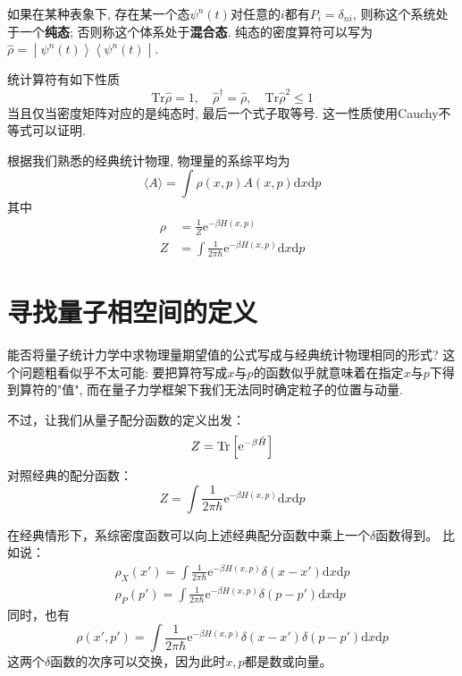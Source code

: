         如果在某种表象下, 存在某一个态$\psi^{n}(t)$对任意的$i$都有$P_i = \delta_{ni}$, 则称这个系统处于一个\textbf{纯态}; 否则称这个体系处于\textbf{混合态}.
        纯态的密度算符可以写为$\hat{\rho} = \left. \middle| {\psi^{n}(t)} \right\rangle \left\langle {\psi^{n}(t)} \middle| \right.$. 

        统计算符有如下性质
        \begin{equation}
            \mathrm{Tr}\hat\rho = 1, \quad
            \hat\rho^{\dagger} = \hat\rho, \quad
            \mathrm{Tr}\hat\rho^{2} \leq 1
        \end{equation}
        当且仅当密度矩阵对应的是纯态时, 最后一个式子取等号. 这一性质使用Cauchy不等式可以证明. 

        \splitline

        根据我们熟悉的经典统计物理, 物理量的系综平均为
        \begin{equation}
            \langle A \rangle = \int \rho(x,p) A(x,p) \mathrm{d}x\mathrm{d}p
        \end{equation}
        其中
        \begin{equation}\begin{aligned}
            \rho &= \frac 1Z \mathrm{e}^{-\beta H(x,p)}\\
            Z &= \int \frac 1{2\pi \hbar} \mathrm{e}^{-\beta H(x,p)} \mathrm{d}x \mathrm{d}p
        \end{aligned}\end{equation}

    \section{寻找量子相空间的定义}

        能否将量子统计力学中求物理量期望值的公式写成与经典统计物理相同的形式? 
        这个问题粗看似乎不太可能: 要把算符写成$x$与$p$的函数似乎就意味着在指定$x$与$p$下得到算符的"值", 
        而在量子力学框架下我们无法同时确定粒子的位置与动量. 
        
        不过，让我们从量子配分函数的定义出发：
        \[
            Z = \textrm{Tr}\left[\mathrm{e}^{-\beta \hat{H}}\right]
        \]
        对照经典的配分函数：
        \[
            Z = \int \frac {1}{2\pi \hbar} \mathrm{e}^{-\beta H(x,p)} \mathrm{d}x \mathrm{d}p
        \]

        在经典情形下，系综密度函数可以向上述经典配分函数中乘上一个\(\delta\)函数得到。
        比如说：
        \[
            \begin{gathered}
                \rho_X(x') = \int \frac 1{2\pi \hbar} \mathrm{e}^{-\beta H(x,p)} \delta(x - x') \mathrm{d}x \mathrm{d}p
                \\
                \rho_P(p') = \int \frac 1{2\pi \hbar} \mathrm{e}^{-\beta H(x,p)} \delta(p - p') \mathrm{d}x \mathrm{d}p
            \end{gathered}
        \]
        同时，也有
        \[
            \rho(x', p') = \int \frac 1{2\pi \hbar} \mathrm{e}^{-\beta H(x,p)} \delta(x - x')\delta(p - p') \mathrm{d}x \mathrm{d}p
        \]
        这两个\(\delta\)函数的次序可以交换，因为此时\(x, p\)都是数或向量。

